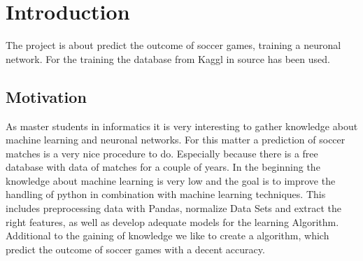 
\chapter{Introduction}

The project is about predict the outcome of soccer games, training a neuronal network. For the training the database from Kaggl in source \cite{kggl:2019} has been used. 

\section{Motivation}
As master students in informatics it is very interesting to gather knowledge about machine learning and neuronal networks. For this matter a prediction of soccer matches is a very nice procedure to do. Especially because there is a free database with data of matches for a couple of years. In the beginning the knowledge about machine learning is very low and the goal is to improve the handling of python in combination with machine learning techniques. This includes preprocessing data with Pandas, normalize Data Sets and extract the right features, as well as develop adequate models for the learning Algorithm. Additional to the gaining of knowledge we like to create a algorithm, which predict the outcome of soccer games with a decent accuracy.
